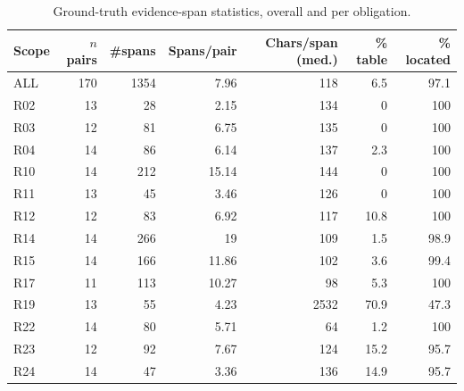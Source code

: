\begin{table}[htbp]
  \centering
  \caption{Ground-truth evidence-span statistics, overall and per obligation.}
  \label{tab:gt-span-stats}
  \begin{tabular}{lrrrrrr}
    \toprule
    Scope & $n$ pairs & \#spans & Spans/pair & Chars/span (med.) & \% table & \% located \\
    \midrule
    ALL & 170 & 1354 & 7.96 & 118 & 6.5 & 97.1 \\
    R02 & 13 & 28 & 2.15 & 134 & 0 & 100 \\
    R03 & 12 & 81 & 6.75 & 135 & 0 & 100 \\
    R04 & 14 & 86 & 6.14 & 137 & 2.3 & 100 \\
    R10 & 14 & 212 & 15.14 & 144 & 0 & 100 \\
    R11 & 13 & 45 & 3.46 & 126 & 0 & 100 \\
    R12 & 12 & 83 & 6.92 & 117 & 10.8 & 100 \\
    R14 & 14 & 266 & 19 & 109 & 1.5 & 98.9 \\
    R15 & 14 & 166 & 11.86 & 102 & 3.6 & 99.4 \\
    R17 & 11 & 113 & 10.27 & 98 & 5.3 & 100 \\
    R19 & 13 & 55 & 4.23 & 2532 & 70.9 & 47.3 \\
    R22 & 14 & 80 & 5.71 & 64 & 1.2 & 100 \\
    R23 & 12 & 92 & 7.67 & 124 & 15.2 & 95.7 \\
    R24 & 14 & 47 & 3.36 & 136 & 14.9 & 95.7 \\
    \bottomrule
  \end{tabular}
\end{table}
